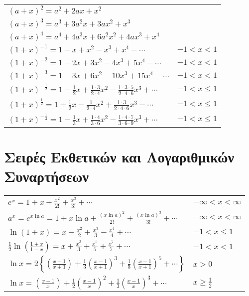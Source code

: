 \begin{tabular}{ll}
	$ (a+x)^{2} = a^{2} + 2ax + x^{2} $ & \\
	$ (a+x)^{3} = a^{3} + 3a^{2}x + 3ax^{2} + x^{3} $ &  \\
	$ (a+x)^{4} = a^{4} + 4a^{3}x + 6a^{2}x^{2} + 4ax^{3} + x^{4} $ & \\
	$ (1+x)^{-1} = 1 - x + x^{2} - x^{3} + x^{4} - \cdots $ & $-1<x<1$ \\
	$ (1+x)^{-2} = 1 - 2x + 3x^{2} - 4x^{3} + 5x^{4} - \cdots $ & $-1<x<1$ \\
	$ (1+x)^{-3} = 1 - 3x + 6x^{2} - 10x^{3} + 15x^{4} - \cdots $ & $-1<x<1$ \\
	$ (1+x)^{- \frac{1}{2}} = 1 - \frac{1}{2}x + \frac{1 \cdot 3}{2 \cdot
4}x^{2} - \frac{1 \cdot 3 \cdot 5}{2 \cdot 4 \cdot 6} x^{3} + \cdots $ &
$-1<x\leq 1 $ \\
$ (1+x)^{\frac{1}{2}} = 1 + \frac{1}{2} x - \frac{1}{2 \cdot 4} x^{2} +
	\frac{1 \cdot 3}{2 \cdot 4 \cdot 6} x^{3} - \cdots$ & $-1<x\leq 1$ \\
	$ (1+x)^{-\frac{1}{3}} = 1 - \frac{1}{3} x + \frac{1 \cdot 4}{3 \cdot 6}
	x^{2} - \frac{1 \cdot 4 \cdot 7}{3 \cdot 6 \cdot 9} x^{3} + \cdots$ &
	$-1<x\leq 1$  
\end{tabular}

\section{Σειρές Εκθετικών και Λογαριθμικών Συναρτήσεων}
\begin{tabular}{ll}
	$ e^{x} = 1 + x + \frac{x^{2}}{2!} + \frac{x^{3}}{3!} + \cdots  $ &
	$-\infty<x<\infty$ \\
	$ a^{x} = e^{x\ln a} = 1 + x\ln a + \frac{(x\ln a)^{2}}{2!} +
	\frac{(x\ln a)^{3}}{3!} + \cdots  $ & $ -\infty < x < \infty $ \\
	$ \ln{(1+x)} = x - \frac{x^{2}}{2} + \frac{x^{3}}{3} - \frac{x^{4}}{4}
	+ \cdots $ & $ -1 < x \leq 1 $ \\
	$ \frac{1}{2} \ln{(\frac{1+x}{1-x})} = x + \frac{x^{3}}{3} +
	\frac{x^{5}}{5} + \frac{x^{7}}{7} + \cdots $ & $ -1 < x < 1 $ \\
	$ \ln{x} = 2\left\{ (\frac{x-1}{x+1} ) + \frac{1}{3} (\frac{x-1}{x+1}
)^{3} + \frac{1}{5} (\frac{x-1}{x+1})^{5} + \cdots  \right\} $ & $ x>0 $ \\
$ \ln{x} = (\frac{x-1}{x}) + \frac{1}{2} (\frac{x-1}{x})^{2} +
	\frac{1}{3} (\frac{x-1}{x} )^{3} + \cdots  $ & $ x \geq \frac{1}{2}
	$ 
\end{tabular}


